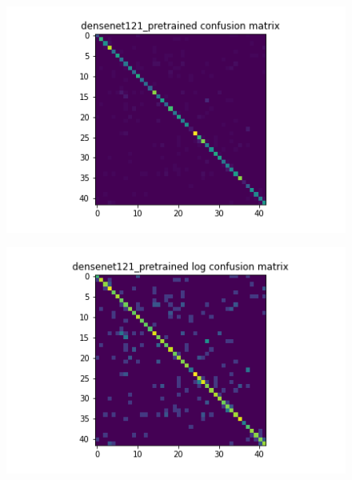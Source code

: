 \begin{figure}[t]
  \begin{minipage}[b]{.5\linewidth}
    \centering
    {\includegraphics[width=1.2\textwidth]{figs/conf_matrix/densenet121_pretrained_conf.png}}
  \end{minipage}
  \hfill
  \begin{minipage}[b]{.5\linewidth}
    \centering

    {\includegraphics[width=1.2\textwidth]{figs/conf_matrix/densenet121_pretrained_log_conf.png}}
  \end{minipage}
  \vfill
  \begin{minipage}[b]{.5\linewidth}
    \centering


\end{minipage}
\end{figure}
